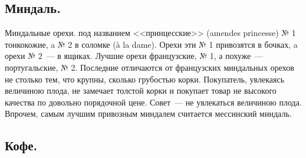 \subsection{Миндаль.}
Миндальные орехи. под названием <<принцесские>> (amendes princesse) № 1 тонкокожие, a № 2 в соломке (à la dame). Орехи эти № 1 привозятся в бочках, a орехи № 2~--- в ящиках. Лучшие орехи французские, № 1, а похуже~--- португальские, № 2. Последние отличаются от французских миндальных орехов не столько тем, что крупны, сколько грубостью корки. Покупатель, увлекаясь величиною плода, не замечает толстой корки и покупает товар не высокого качества по довольно порядочной цене. Совет~--- не увлекаться величиною плода. Впрочем, самым лучшим привозным миндалем считается мессинский миндаль.

\subsection{Кофе.}

